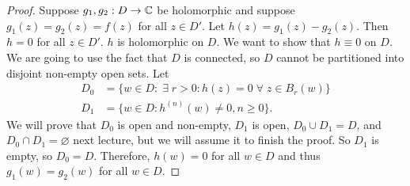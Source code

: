 \begin{proof}
    Suppose $g_1, g_2: D \to \mathbb{C}$ be holomorphic and suppose
    $g_1(z) = g_2(z) = f(z)$ for all $z \in D'$.
    Let $h(z) = g_1(z) - g_2(z)$.
    Then $h = 0$ for all $z \in D'$.
    $h$ is holomorphic on $D$.
    We want to show that $h \equiv 0$ on $D$.
    We are going to use the fact that $D$ is connected,
    so $D$ cannot be partitioned into disjoint 
    non-empty open sets.
    Let
    \begin{align*}
        D_0 &= 
        \{
            w \in D: \;\exists\; r>0: h(z)=0
            \;\forall\; z\in B_r(w)
        \} \\
        D_1 &=
        \{w \in D: h^{(n)}(w) \neq 0, n \geq 0\}.
    \end{align*}
    We will prove that $D_0$ is open and non-empty,
    $D_1$ is open, $D_0 \cup D_1 = D$,
    and $D_0 \cap D_1 = \varnothing$ next lecture, but we
    will assume it to finish the proof.
    So $D_1$ is empty, so $D_0 = D$. Therefore,
    $h(w) = 0$ for all $w \in D$ and thus
    $g_1(w) = g_2(w)$ for all $w \in D$.
\end{proof}
